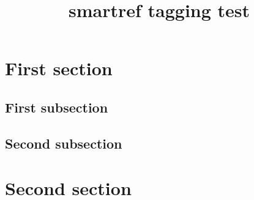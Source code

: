 \documentclass{article}
\title{smartref tagging test}
\begin{document}
\section{First section}
\subsection{First subsection}
\subsection[second subsec.]{Second subsection}
\label{sec}






\section{Second section}



\end{document}
